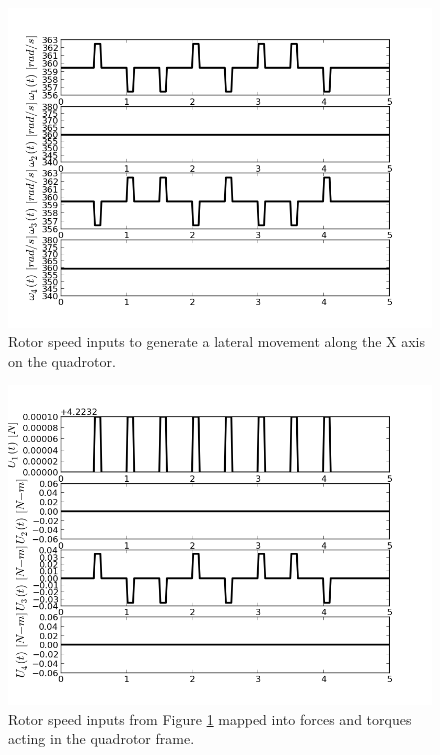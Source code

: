 \begin{figure}[h!]
\centering
\includegraphics[scale=0.7]{Images/Chapter3/Lateral_X/Inputs.png}
\caption{Rotor speed inputs to generate a lateral movement along the X axis on the quadrotor.}
\label{fig:lateralX_inputs}
\end{figure}

\begin{figure}[H]
\centering
\includegraphics[scale=0.7]{Images/Chapter3/Lateral_X/Torque_inputs.png}
\caption{Rotor speed inputs from Figure \ref{fig:lateralX_inputs} mapped into forces and torques acting in the quadrotor frame.}
\label{fig:lateralX_torqueinputs}
\end{figure}


